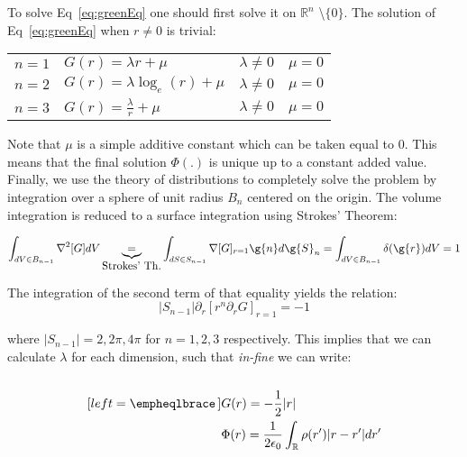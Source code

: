 \noindent To solve Eq~\ref{eq:greenEq} one should first  solve it on $\mathbb{R}^n$ \textbackslash $\{0\}$. The solution of Eq~\ref{eq:greenEq} when $r\ne 0$ is trivial:

\begin{center}
\begin{tabular}{p{1.5cm}|p{4cm}|p{2cm}|p{2cm}} 
$n=1$          &   $G(r) = \lambda r + \mu$ & $\lambda \ne 0$ & $\mu = 0$\\
$n=2$          & $G(r) = \lambda \log_{e}(r) + \mu$ &  $\lambda \ne 0$ & $\mu = 0$ \\
$n=3$          & $G(r) = \frac{\lambda}{r} + \mu$ &  $\lambda \ne 0$ & $\mu = 0$ \\
\end{tabular}
\end{center}

\noindent Note that $\mu$ is a simple additive constant which can be taken equal to $0$. This means that the final solution $\Phi (.)$ is unique up to a constant added value. Finally, we use the theory of distributions to completely solve the problem by integration over a sphere of unit radius $B_n$ centered on the origin. The volume integration is reduced to a surface integration using Strokes' Theorem:

\begin{equation}
\int_{dV\in B_{n-1}}\nabla^2 [G]dV\underbrace{=}_{\mbox{Strokes' Th.}}\int_{dS\in S_{n-1}}\nabla [G]_{r=1}\g{n}d\g{S}_n=\int_{dV\in B_{n-1}}  \delta(\g{r})dV = 1
\label{eq:greenEq2}
\end{equation}

\noindent The integration of the second term of that equality yields the relation:\\

\begin{equation}
\label{eq:NormalizeGreenFunction}
|S_{n-1}| \partial_r [r^{n}\partial_r G]_{r=1}=  -1
\end{equation}

\noindent where $|S_{n-1}| = 2, 2\pi, 4\pi$ for $n= 1,2,3$ respectively. This implies that we can calculate $\lambda$ for each dimension, such that \textit{in-fine} we can write:\\

\noindent {}\\

\begin{subequations}
\label{eq:OneDimensionGreen}
\begin{align}[left = \empheqlbrace\,]
&  G(r) = -\frac{1}{2}|r|\\
&  \Phi (r) = \frac{1}{2\epsilon_0}\int_{\mathbb{R}}\rho(r')|r-r'|dr'
\end{align}
\end{subequations}


